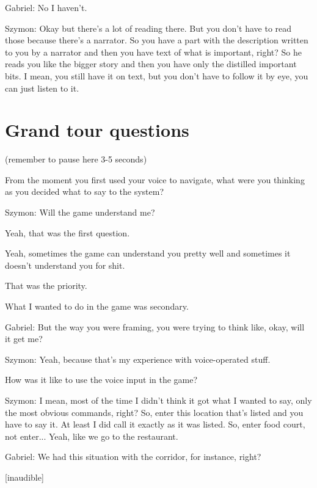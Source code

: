 \begin{QandA}
\begin{answered}
               Gabriel: No I haven't.

               Szymon: Okay but there's a lot of reading there.
               But you don't have to read those because there's a narrator.
               So you have a part with the description written to you by a narrator and then you have text of what is important, right?
               So he reads you like the bigger story and then you have only the distilled important bits.
               I mean, you still have it on text, but you don't have to follow it by eye, you can just listen to it.

         \end{answered}
         
\end{QandA}




\section{Grand tour questions}
(remember to pause here 3-5 seconds)

\begin{QandA}


   \item From the moment you first used your voice to navigate, what were you thinking as you decided what to say to the system?

         \begin{answered}
            Szymon: Will the game understand me?

            Yeah, that was the first question.

            Yeah, sometimes the game can understand you pretty well and sometimes it doesn't understand you for shit.

            That was the priority.

            What I wanted to do in the game was secondary.

            Gabriel: But the way you were framing, you were trying to think like, okay, will it get me?
            
            Szymon: Yeah, because that's my experience with voice-operated stuff.
         \end{answered}

    \item How was it like to use the voice input in the game?
         \begin{answered}
            Szymon: I mean, most of the time I didn't think it got what I wanted to say, only the most obvious commands, right?
            So, enter this location that's listed and you have to say it.
            At least I did call it exactly as it was listed.
            So, enter food court, not enter... Yeah, like we go to the restaurant.

            Gabriel: We had this situation with the corridor, for instance, right?

            [inaudible]
         \end{answered}


\end{QandA}




